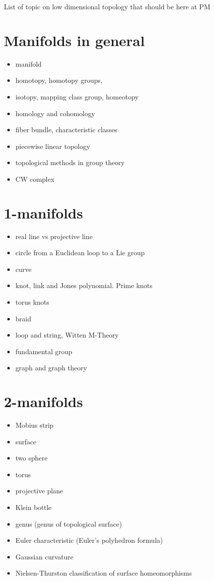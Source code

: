 \documentclass[12pt]{article}
\begin{document}
List of topic on low dimensional topology that should be here at PM

\section{Manifolds in general}
\begin{itemize}
\item manifold
\item homotopy, homotopy groups, 
\item isotopy, mapping class group, homeotopy
\item homology and cohomology
\item fiber bundle, characteristic classes
\item piecewise linear topology
\item topological methods in group theory
\item CW complex
\end{itemize}


\section{1-manifolds}
\begin{itemize}
\item real line vs projective line
\item circle from a Euclidean loop to a Lie group
\item curve
\item knot, link and Jones polynomial. Prime knots
\item torus knots
\item braid
\item loop and string, Witten M-Theory
\item fundamental group
\item graph and graph theory
\end{itemize} 

\section{2-manifolds}
\begin{itemize}
\item Mobius strip
\item surface
\item two sphere
\item torus
\item projective plane
\item Klein bottle
\item genus (genus of topological surface)
\item Euler characteristic (Euler's polyhedron formula)
\item Gaussian curvature
\item Nielsen-Thurston classification of surface homeomorphisms
\end{itemize}
\end{document}
